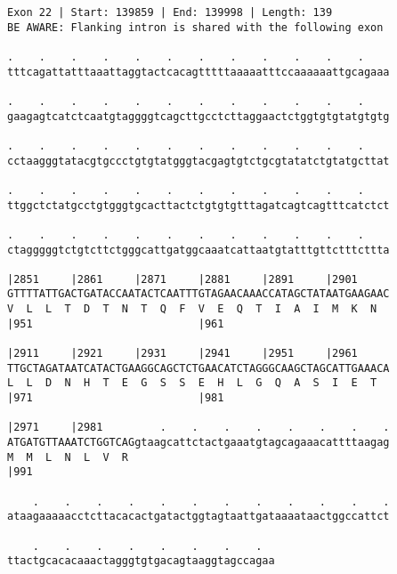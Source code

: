 \documentclass{article}
\begin{document}
\begin{Verbatim}
Exon 22 | Start: 139859 | End: 139998 | Length: 139
BE AWARE: Flanking intron is shared with the following exon
 
.    .    .    .    .    .    .    .    .    .    .    .    
tttcagattatttaaattaggtactcacagtttttaaaaatttccaaaaaattgcagaaa
  
.    .    .    .    .    .    .    .    .    .    .    .    
gaagagtcatctcaatgtaggggtcagcttgcctcttaggaactctggtgtgtatgtgtg
  
.    .    .    .    .    .    .    .    .    .    .    .    
cctaagggtatacgtgccctgtgtatgggtacgagtgtctgcgtatatctgtatgcttat
  
.    .    .    .    .    .    .    .    .    .    .    .    
ttggctctatgcctgtgggtgcacttactctgtgtgtttagatcagtcagtttcatctct
  
.    .    .    .    .    .    .    .    .    .    .    .    
ctagggggtctgtcttctgggcattgatggcaaatcattaatgtatttgttctttcttta
  
|2851     |2861     |2871     |2881     |2891     |2901     
GTTTTATTGACTGATACCAATACTCAATTTGTAGAACAAACCATAGCTATAATGAAGAAC
V  L  L  T  D  T  N  T  Q  F  V  E  Q  T  I  A  I  M  K  N  
|951                          |961                          
  
|2911     |2921     |2931     |2941     |2951     |2961     
TTGCTAGATAATCATACTGAAGGCAGCTCTGAACATCTAGGGCAAGCTAGCATTGAAACA
L  L  D  N  H  T  E  G  S  S  E  H  L  G  Q  A  S  I  E  T  
|971                          |981                          
  
|2971     |2981         .    .    .    .    .    .    .    .
ATGATGTTAAATCTGGTCAGgtaagcattctactgaaatgtagcagaaacattttaagag
M  M  L  N  L  V  R                                         
|991                                                        
  
    .    .    .    .    .    .    .    .    .    .    .    .
ataagaaaaacctcttacacactgatactggtagtaattgataaaataactggccattct
  
    .    .    .    .    .    .    .    .  
ttactgcacacaaactagggtgtgacagtaaggtagccagaa
\end{Verbatim}
\newpage
\end{document}
